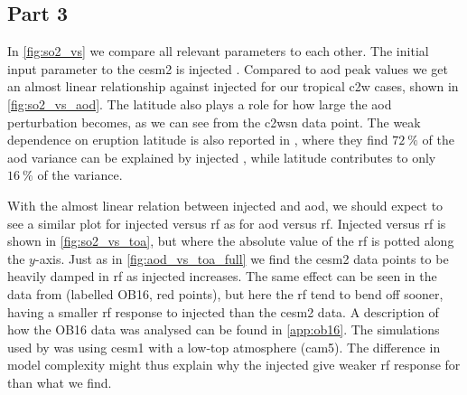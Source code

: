 \documentclass{ametsocV5}
\newcommand{\iso}[1][i]{{#1}njected \ce{SO2}}
\begin{document}
%

\subsection{Part 3}

In \cref{fig:so2_vs} we compare all relevant parameters to each other. The initial input
parameter to the \ac{cesm2} is injected . Compared to \ac{aod} peak values we
get an almost linear relationship against \iso{} for our tropical \ac{c2w} cases, shown
in \cref{fig:so2_vs_aod}. The latitude also plays a role for how large the \ac{aod}
perturbation becomes, as we can see from the \ac{c2wsn} data point. The weak dependence
on eruption latitude is also reported in \citet{marshall2019}, where they find
\(\SI{72}{\percent}\) of the \ac{aod} variance can be explained by \iso{}, while
latitude contributes to only \(\SI{16}{\percent}\) of the variance.


With the almost linear relation between injected  and \ac{aod}, we should expect
to see a similar plot for \iso{} versus \ac{rf} as for \ac{aod} versus \ac{rf}. \iso[I]
versus \ac{rf} is shown in \cref{fig:so2_vs_toa}, but where the absolute value of the
\ac{rf} is potted along the \(y\)-axis. Just as in \cref{fig:aod_vs_toa_full} we find
the \ac{cesm2} data points to be heavily damped in \ac{rf} as \iso{} increases. The same
effect can be seen in the data from \citet{ottobliesner2016} (labelled OB16, red
points), but here the \ac{rf} tend to bend off sooner, having a smaller \ac{rf} response
to \iso{} than the \ac{cesm2} data. A description of how the OB16 data was analysed can
be found in \cref{app:ob16}. The simulations used by \citet{ottobliesner2016} was using
\ac{cesm1} with a low-top atmosphere (\ac{cam5}). The difference in model complexity
might thus explain why the \iso{} give weaker \ac{rf} response for
\citet{ottobliesner2016} than what we find.
\end{document}
